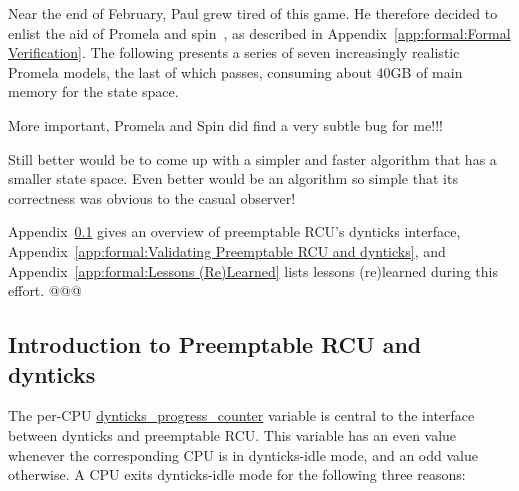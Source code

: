Near the end of February, Paul grew tired of this game.
He therefore decided to enlist the aid of
Promela and spin~\cite{Holzmann03a}, as described in
Appendix~\ref{app:formal:Formal Verification}.
The following presents a series of seven increasingly realistic
Promela models, the last of which passes, consuming about
40GB of main memory for the state space.

More important, Promela and Spin did find a very subtle bug for me!!!

 \QuickQuizEnd

Still better would be to come up with a simpler and faster algorithm
that has a smaller state space.
Even better would be an algorithm so simple that its correctness was
obvious to the casual observer!

Appendix~\ref{app:formal:Introduction to Preemptable RCU and dynticks}
gives an overview of preemptable RCU's dynticks interface,
Appendix~\ref{app:formal:Validating Preemptable RCU and dynticks},
and
Appendix~\ref{app:formal:Lessons (Re)Learned} lists
lessons (re)learned during this effort. @@@

\subsection{Introduction to Preemptable RCU and dynticks}
\label{app:formal:Introduction to Preemptable RCU and dynticks}

The per-CPU \url{dynticks_progress_counter} variable is
central to the interface between dynticks and preemptable RCU.
This variable has an even value whenever the corresponding CPU
is in dynticks-idle mode, and an odd value otherwise.
A CPU exits dynticks-idle mode for the following three reasons:


